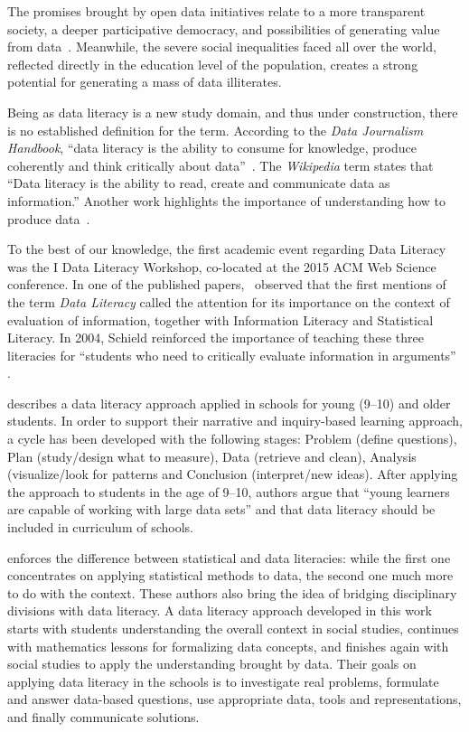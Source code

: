 The promises brought by open data initiatives relate to a more transparent society, a deeper participative democracy, and possibilities of generating value from data~\cite{Huijboom2011}.
Meanwhile, the severe social inequalities faced all over the world, reflected directly in the education level of the population, creates a strong potential for generating a mass of data illiterates.

Being as data literacy is a new study domain, and thus under construction, there is no established definition for the term. According to the \emph{Data Journalism Handbook}, “data literacy is the ability to consume for knowledge, produce coherently and think critically about data”~\cite{Grey2012}. The \emph{Wikipedia} term states that “Data literacy is the ability to read, create and communicate data as information.” Another work highlights the importance of understanding how to produce data~\cite{Carlson2011}.

To the best of our knowledge, the first academic event regarding Data Literacy was the I Data Literacy Workshop, co-located at the 2015 ACM Web Science conference.
In one of the published papers,~ observed that the first mentions of the term \emph{Data Literacy} called the attention for its importance on the context of evaluation of information, together with Information Literacy and Statistical Literacy.
In 2004, Schield reinforced the importance of teaching these three literacies for ``students who need to critically evaluate information in arguments'' \cite{Schield2004}.

 describes a data literacy approach applied in schools for young (9--10) and older students.
In order to support their narrative and inquiry-based learning approach, a cycle has been developed with the following stages: Problem (define questions), Plan (study/design what to measure), Data (retrieve and clean), Analysis (visualize/look for patterns and Conclusion (interpret/new ideas).
After applying the approach to students in the age of 9--10, authors argue that ``young learners are capable of working with large data sets'' and that data literacy should be included in curriculum of schools.


 enforces the difference between statistical and data literacies: while the first one concentrates on applying statistical methods to data, the second one much more to do with the context.
These authors also bring the idea of bridging disciplinary divisions with data literacy.
A data literacy approach developed in this work starts with students understanding the overall context in social studies, continues with mathematics lessons for formalizing data concepts, and finishes again with social studies to apply the understanding brought by data.
Their goals on applying data literacy in the schools is to investigate real problems, formulate and answer data-based questions, use appropriate data, tools and representations, and finally communicate solutions.

